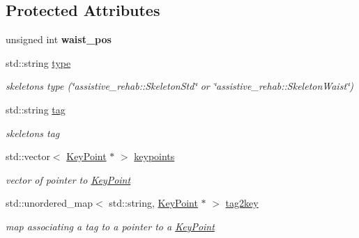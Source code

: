 \subsection*{Protected Attributes}
\begin{DoxyCompactItemize}
\item 
\mbox{\label{classassistive__rehab_1_1SkeletonWaist_ae3c9f0a5fb48282e3d4617c88d508fa8}} 
unsigned int {\bfseries waist\+\_\+pos}
\item 
\mbox{\label{classassistive__rehab_1_1Skeleton_a679b826030f01f307d938e583f27d23b}} 
std\+::string \mbox{\hyperlink{classassistive__rehab_1_1Skeleton_a679b826030f01f307d938e583f27d23b}{type}}
\begin{DoxyCompactList}\small\item\em skeleton\textquotesingle{}s type (\char`\"{}assistive\+\_\+rehab\+::\+Skeleton\+Std\char`\"{} or \char`\"{}assistive\+\_\+rehab\+::\+Skeleton\+Waist\char`\"{}) \end{DoxyCompactList}\item 
\mbox{\label{classassistive__rehab_1_1Skeleton_a3d1ce5280300e012826948dc4383c2cb}} 
std\+::string \mbox{\hyperlink{classassistive__rehab_1_1Skeleton_a3d1ce5280300e012826948dc4383c2cb}{tag}}
\begin{DoxyCompactList}\small\item\em skeleton\textquotesingle{}s tag \end{DoxyCompactList}\item 
\mbox{\label{classassistive__rehab_1_1Skeleton_a5f61fbdd10430985cd6754e182226787}} 
std\+::vector$<$ \mbox{\hyperlink{classassistive__rehab_1_1KeyPoint}{Key\+Point}} $\ast$ $>$ \mbox{\hyperlink{classassistive__rehab_1_1Skeleton_a5f61fbdd10430985cd6754e182226787}{keypoints}}
\begin{DoxyCompactList}\small\item\em vector of pointer to \mbox{\hyperlink{classassistive__rehab_1_1KeyPoint}{Key\+Point}} \end{DoxyCompactList}\item 
\mbox{\label{classassistive__rehab_1_1Skeleton_ada4d4b327f1f71520e62e42db9d4c656}} 
std\+::unordered\+\_\+map$<$ std\+::string, \mbox{\hyperlink{classassistive__rehab_1_1KeyPoint}{Key\+Point}} $\ast$ $>$ \mbox{\hyperlink{classassistive__rehab_1_1Skeleton_ada4d4b327f1f71520e62e42db9d4c656}{tag2key}}
\begin{DoxyCompactList}\small\item\em map associating a tag to a pointer to a \mbox{\hyperlink{classassistive__rehab_1_1KeyPoint}{Key\+Point}} \end{DoxyCompactList}\item 

\end{DoxyCompactItemize}
